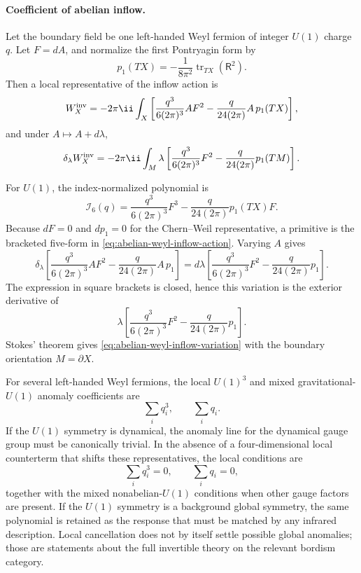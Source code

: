 \paragraph{Coefficient of abelian inflow.}
Let the boundary field be one left-handed Weyl fermion of integer \(U(1)\)
charge \(q\).  Let \(F=dA\), and normalize the first Pontryagin form by
\[
  p_1(TX)
  =
  -\frac1{8\pi^2}
  \operatorname{tr}_{TX}(\mathsf R^2).
\]
Then a local representative of the inflow action is
\begin{equation}
  W_X^{\rm inv}
  =
  -2\pi\ii
  \int_X
  \left[
    \frac{q^3}{6(2\pi)^3} A F^2
    -
    \frac{q}{24(2\pi)} A\,p_1(TX)
  \right],
  \label{eq:abelian-weyl-inflow-action}
\end{equation}
and under \(A\mapsto A+d\lambda\),
\begin{equation}
  \delta_\lambda W_X^{\rm inv}
  =
  -2\pi\ii
  \int_M
  \lambda
  \left[
    \frac{q^3}{6(2\pi)^3}F^2
    -
    \frac{q}{24(2\pi)}p_1(TM)
  \right].
  \label{eq:abelian-weyl-inflow-variation}
\end{equation}

For \(U(1)\), the index-normalized polynomial is
\[
  \mathcal I_6(q)
  =
  \frac{q^3}{6(2\pi)^3}F^3
  -
  \frac{q}{24(2\pi)}p_1(TX)F .
\]
Because \(dF=0\) and \(dp_1=0\) for the Chern--Weil representative, a
primitive is the bracketed five-form in
\eqref{eq:abelian-weyl-inflow-action}.  Varying \(A\) gives
\[
  \delta_\lambda
  \left[
    \frac{q^3}{6(2\pi)^3}AF^2
    -
    \frac{q}{24(2\pi)}A\,p_1
  \right]
  =
  d\lambda
  \left[
    \frac{q^3}{6(2\pi)^3}F^2
    -
    \frac{q}{24(2\pi)}p_1
  \right].
\]
The expression in square brackets is closed, hence this variation is the
exterior derivative of
\[
  \lambda
  \left[
    \frac{q^3}{6(2\pi)^3}F^2
    -
    \frac{q}{24(2\pi)}p_1
  \right].
\]
Stokes' theorem gives \eqref{eq:abelian-weyl-inflow-variation} with the
boundary orientation \(M=\partial X\).

For several left-handed Weyl fermions, the local \(U(1)^3\) and mixed
gravitational-\(U(1)\) anomaly coefficients are
\[
  \sum_i q_i^3,\qquad \sum_i q_i .
\]
If the \(U(1)\) symmetry is dynamical, the anomaly line for the dynamical
gauge group must be canonically trivial.  In the absence of a four-dimensional
local counterterm that shifts these representatives, the local conditions are
\[
  \sum_i q_i^3=0,\qquad \sum_i q_i=0,
\]
together with the mixed nonabelian-\(U(1)\) conditions when other gauge
factors are present.  If the \(U(1)\) symmetry is a background global
symmetry, the same polynomial is retained as the response that must be
matched by any infrared description.  Local cancellation does not by itself
settle possible global anomalies; those are statements about the full
invertible theory on the relevant bordism category.

